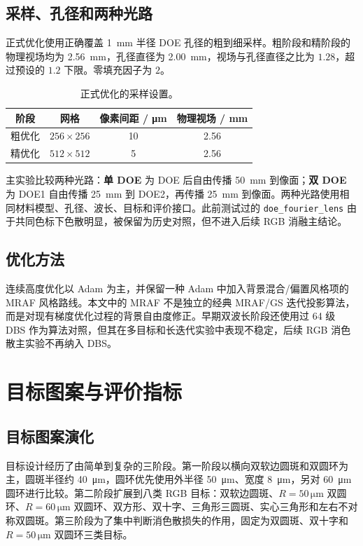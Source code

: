 \documentclass[UTF8,a4paper,12pt]{ctexart}
\newcommand{\um}{\si{\micro\meter}}
\begin{document}
\subsection{采样、孔径和两种光路}
正式优化使用正确覆盖 \SI{1}{mm} 半径 DOE 孔径的粗到细采样。粗阶段和精阶段的物理视场均为 \SI{2.56}{mm}，孔径直径为 \SI{2.00}{mm}，视场与孔径直径之比为 $1.28$，超过预设的 $1.2$ 下限。零填充因子为 $2$。
\begin{table}[H]
\centering
\caption{正式优化的采样设置。}
\label{tab:sampling}
\begin{tabular}{cccc}
\toprule
阶段 & 网格 & 像素间距 / \si{\micro\meter} & 物理视场 / \si{mm} \\
\midrule
粗优化 & $256\times256$ & 10 & 2.56 \\
精优化 & $512\times512$ & 5 & 2.56 \\
\bottomrule
\end{tabular}
\end{table}

主实验比较两种光路：\textbf{单 DOE} 为 DOE 后自由传播 \SI{50}{mm} 到像面；\textbf{双 DOE} 为 DOE1 自由传播 \SI{25}{mm} 到 DOE2，再传播 \SI{25}{mm} 到像面。两种光路使用相同材料模型、孔径、波长、目标和评价接口。此前测试过的 \texttt{doe\_fourier\_lens} 由于共同色标下色散明显，被保留为历史对照，但不进入后续 RGB 消融主结论。

\subsection{优化方法}
连续高度优化以 Adam 为主，并保留一种 Adam 中加入背景混合/偏置风格项的 MRAF 风格路线。本文中的 MRAF 不是独立的经典 MRAF/GS 迭代投影算法，而是对现有梯度优化过程的背景自由度修正。早期双波长阶段还使用过 64 级 DBS 作为算法对照，但其在多目标和长迭代实验中表现不稳定，后续 RGB 消色散主实验不再纳入 DBS。

\section{目标图案与评价指标}
\subsection{目标图案演化}
目标设计经历了由简单到复杂的三阶段。第一阶段以横向双软边圆斑和双圆环为主，圆斑半径约 \SI{40}{\micro\meter}，圆环优先使用外半径 \SI{50}{\micro\meter}、宽度 \SI{8}{\micro\meter}，另对 \SI{60}{\micro\meter} 圆环进行比较。第二阶段扩展到八类 RGB 目标：双软边圆斑、$R=50\,\um$ 双圆环、$R=60\,\um$ 双圆环、双方形、双十字、三角形三圆斑、实心三角形和左右不对称双圆斑。第三阶段为了集中判断消色散损失的作用，固定为双圆斑、双十字和 $R=50\,\um$ 双圆环三类目标。
\end{document}
